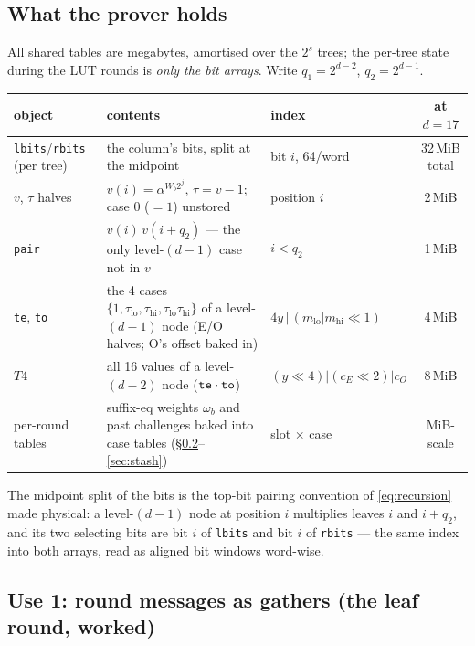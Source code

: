 \documentclass[11pt]{article}
\newcommand{\code}[1]{{\def\_{\textunderscore\allowbreak}\texttt{#1}}}
\theoremstyle{definition}
\begin{document}
\subsection{What the prover holds}
\label{sec:tables}

All shared tables are megabytes, amortised over the $2^s$ trees; the
per-tree state during the LUT rounds is \emph{only the bit arrays}.
Write $q_1 = 2^{d-2}$, $q_2 = 2^{d-1}$.

\begin{center}
\small
\begin{tabular}{l>{\raggedright\arraybackslash}p{5.6cm}lc}
\toprule
object & contents & index & at $d{=}17$ \\
\midrule
\code{lbits}/\code{rbits} (per tree) &
  the column's bits, split at the midpoint &
  bit $i$, 64/word & 32\,MiB total \\
$v$, $\tau$ halves &
  $v(i) = \alpha^{W_b 2^j}$, $\tau = v - 1$; case $0$ ($=1$) unstored &
  position $i$ & 2\,MiB \\
\code{pair} &
  $v(i)\,v(i{+}q_2)$ --- the only level-$(d{-}1)$ case not in $v$ &
  $i < q_2$ & 1\,MiB \\
\code{te}, \code{to} &
  the 4 cases $\{1, \tau_{\mathrm{lo}}, \tau_{\mathrm{hi}},
    \tau_{\mathrm{lo}}\tau_{\mathrm{hi}}\}$ of a level-$(d{-}1)$ node
  (E/O halves; O's offset baked in) &
  $4y \,|\, (m_{\mathrm{lo}} | m_{\mathrm{hi}}{\ll}1)$ & 4\,MiB \\
$T4$ &
  all 16 values of a level-$(d{-}2)$ node ($\code{te}\cdot\code{to}$) &
  $(y{\ll}4)|(c_E{\ll}2)|c_O$ & 8\,MiB \\
per-round tables &
  suffix-eq weights $\omega_b$ and past challenges baked into case
  tables (\S\ref{sec:msgs}--\ref{sec:stash}) &
  slot $\times$ case & MiB-scale \\
\bottomrule
\end{tabular}
\end{center}

The midpoint split of the bits is the top-bit pairing convention of
\eqref{eq:recursion} made physical: a level-$(d{-}1)$ node at position
$i$ multiplies leaves $i$ and $i + q_2$, and its two selecting bits are
bit $i$ of \code{lbits} and bit $i$ of \code{rbits} --- the same index
into both arrays, read as aligned bit windows word-wise.

\subsection{Use 1: round messages as gathers (the leaf round, worked)}
\label{sec:msgs}
\end{document}
